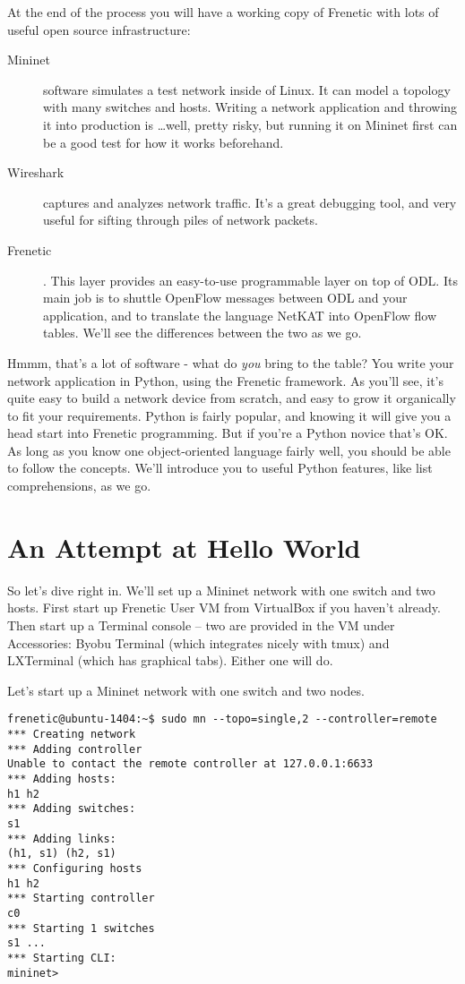 At the end of the process you will have a working copy of Frenetic with lots of useful open source infrastructure:

\begin{description}
\item[Mininet] software simulates a test network inside of Linux.  
It can model a topology with many switches and hosts.  
Writing a network application and throwing it into production is \ldots well, pretty risky, but running it on Mininet first can be a good test for how it works beforehand.  
\item[Wireshark] captures and analyzes network traffic.  
It's a great debugging tool, and very useful for sifting through piles of network packets.
\item[Frenetic].  This layer provides an easy-to-use programmable layer on top of ODL.  Its main job is to shuttle OpenFlow messages between ODL and your application, and to translate the language NetKAT into OpenFlow flow tables.  We'll see the differences between the two as we go.
\end{description}

Hmmm, that's a lot of software - what do {\it you} bring to the table?  You write your network application in Python, using the Frenetic framework.  As you'll see, it's quite easy to build a network device from scratch, and easy to grow it organically to fit your requirements.  Python is fairly popular, and knowing it will give you  a head start into Frenetic programming.  But if you're a Python novice that's OK.  As long as you know one object-oriented language fairly well, you should be able to follow the concepts.  We'll introduce you to useful Python features, like list comprehensions, as we go.  

\section{An Attempt at Hello World}

So let's dive right in.  We'll set up a Mininet network with one switch and two hosts.  
First start up Frenetic User VM from VirtualBox if you haven't already.  
Then start up a Terminal console -- two are provided in the VM under Accessories: Byobu Terminal
(which integrates nicely with tmux)
and LXTerminal (which has graphical tabs).  Either one will do.  

Let's start up a Mininet network with one switch and two nodes.

\begin{verbatim}
frenetic@ubuntu-1404:~$ sudo mn --topo=single,2 --controller=remote
*** Creating network
*** Adding controller
Unable to contact the remote controller at 127.0.0.1:6633
*** Adding hosts:
h1 h2
*** Adding switches:
s1
*** Adding links:
(h1, s1) (h2, s1)
*** Configuring hosts
h1 h2
*** Starting controller
c0
*** Starting 1 switches
s1 ...
*** Starting CLI:
mininet>
\end{verbatim}


